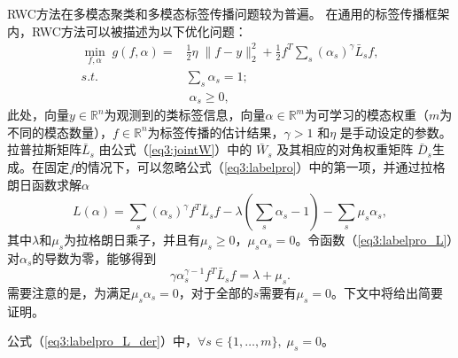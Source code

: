 RWC方法在多模态聚类和多模态标签传播问题较为普遍\cite{wang2009unified,xu2016discriminatively,xu2014multi}。 在通用的标签传播框架内，RWC方法可以被描述为以下优化问题：
\begin{equation}
\begin{split}
\mathop{\mathrm{min}}_{{f},{\alpha}}\;g({f},{\alpha})=&\frac{1}{2}\eta\; \|{f}-{y}\|^2_2+\frac{1}{2}{f}^T \sum_s(\alpha_s)^\gamma{\bar{{L}}}_s{f}, \\
s.t. \quad&\sum_s \alpha_s = 1;\\
&\;\alpha_s \ge 0,
\end{split}
\label{eq3:labelpro}
\end{equation}
此处，向量$ {y} \in  \mathbb{R}^{n} $为观测到的类标签信息，向量$ {\alpha} \in  \mathbb{R}^m$为可学习的模态权重（$m$为不同的模态数量），$ {f} \in  \mathbb{R}^{n}$为标签传播的估计结果，$ \gamma > 1$ 和$ \eta $ 是手动设定的参数。拉普拉斯矩阵$ \bar{{L}}_s $ 由公式（\ref{eq3:jointW}）中的 $ \bar{{W}}_s $  及其相应的对角权重矩阵 $ \bar{{D}}_s $生成。在固定$f$的情况下，可以忽略公式（\ref{eq3:labelpro}）中的第一项，并通过拉格朗日函数求解$ {\alpha} $
\begin{equation}
L({\alpha})=\sum_s(\alpha_s)^\gamma{f}^T {\bar{{L}}}_s{f} - \lambda ( \sum_s \alpha_s - 1)-\sum_s \mu_s \alpha_s,
\label{eq3:labelpro_L}
\end{equation}
其中$\lambda$和$\mu_s$为拉格朗日乘子，并且有$ \mu_s \ge 0$，$ \mu_s\alpha_s=0$。令函数（\ref{eq3:labelpro_L}）对$ \alpha_s $的导数为零，能够得到
\begin{equation}
\gamma \alpha_s^{\gamma-1}{f}^T {\bar{{L}}}_s{f} =\lambda + \mu_s.
\label{eq3:labelpro_L_der}
\end{equation}
需要注意的是，为满足$ \mu_s\alpha_s=0 $，对于全部的$s$需要有$\mu_s=0 $。下文中将给出简要证明。

\begin{proposition}
   \label{thm3} 
    公式（\ref{eq3:labelpro_L_der}）中，$\forall s \in \{1,\dots,m\}, \; \mu_s=0$。
\end{proposition}

